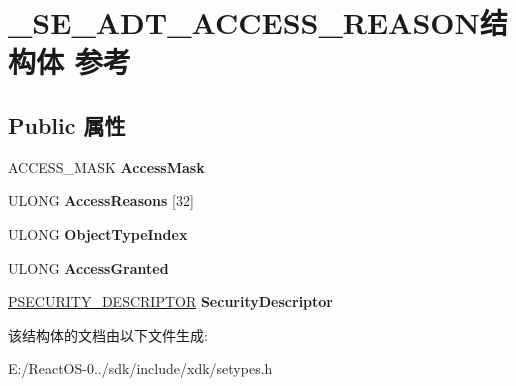 \hypertarget{struct___s_e___a_d_t___a_c_c_e_s_s___r_e_a_s_o_n}{}\section{\+\_\+\+S\+E\+\_\+\+A\+D\+T\+\_\+\+A\+C\+C\+E\+S\+S\+\_\+\+R\+E\+A\+S\+O\+N结构体 参考}
\label{struct___s_e___a_d_t___a_c_c_e_s_s___r_e_a_s_o_n}
\subsection*{Public 属性}
\begin{DoxyCompactItemize}
\item 
\mbox{\label{struct___s_e___a_d_t___a_c_c_e_s_s___r_e_a_s_o_n_a7e068f631ef3418d42f5f4ae5b2a4a59}} 
A\+C\+C\+E\+S\+S\+\_\+\+M\+A\+SK {\bfseries Access\+Mask}
\item 
\mbox{\label{struct___s_e___a_d_t___a_c_c_e_s_s___r_e_a_s_o_n_a44bfcc358ce34a375506a9b0d4fa16f0}} 
U\+L\+O\+NG {\bfseries Access\+Reasons} \mbox{[}32\mbox{]}
\item 
\mbox{\label{struct___s_e___a_d_t___a_c_c_e_s_s___r_e_a_s_o_n_a88fa65ae7b4c901816a43dee7ac72beb}} 
U\+L\+O\+NG {\bfseries Object\+Type\+Index}
\item 
\mbox{\label{struct___s_e___a_d_t___a_c_c_e_s_s___r_e_a_s_o_n_afdd5339f658345d9ac496b5cef3b7cce}} 
U\+L\+O\+NG {\bfseries Access\+Granted}
\item 
\mbox{\label{struct___s_e___a_d_t___a_c_c_e_s_s___r_e_a_s_o_n_a45f0a48a6f82710aa4a0238395d77dcf}} 
\hyperlink{struct___s_e_c_u_r_i_t_y___d_e_s_c_r_i_p_t_o_r}{P\+S\+E\+C\+U\+R\+I\+T\+Y\+\_\+\+D\+E\+S\+C\+R\+I\+P\+T\+OR} {\bfseries Security\+Descriptor}
\end{DoxyCompactItemize}


该结构体的文档由以下文件生成\+:\begin{DoxyCompactItemize}
\item 
E\+:/\+React\+O\+S-\/0../sdk/include/xdk/setypes.\+h\end{DoxyCompactItemize}
